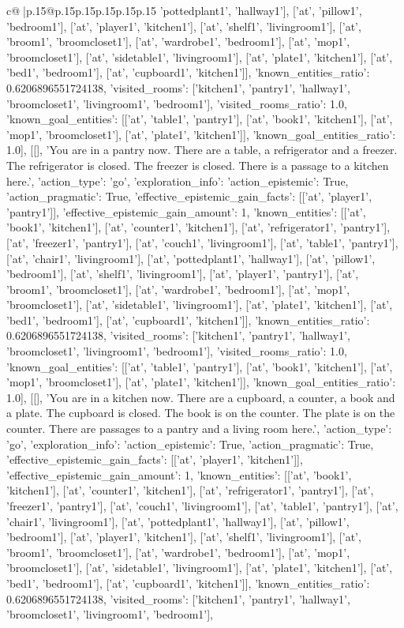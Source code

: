 \documentclass{article}
\begin{document}
{\begin{supertabular}{c@{$\;$}|p{.15\linewidth}@{}p{.15\linewidth}p{.15\linewidth}p{.15\linewidth}p{.15\linewidth}p{.15\linewidth}}
{{{'pottedplant1', 'hallway1'], ['at', 'pillow1', 'bedroom1'], ['at', 'player1', 'kitchen1'], ['at', 'shelf1', 'livingroom1'], ['at', 'broom1', 'broomcloset1'], ['at', 'wardrobe1', 'bedroom1'], ['at', 'mop1', 'broomcloset1'], ['at', 'sidetable1', 'livingroom1'], ['at', 'plate1', 'kitchen1'], ['at', 'bed1', 'bedroom1'], ['at', 'cupboard1', 'kitchen1']], 'known_entities_ratio': 0.6206896551724138, 'visited_rooms': ['kitchen1', 'pantry1', 'hallway1', 'broomcloset1', 'livingroom1', 'bedroom1'], 'visited_rooms_ratio': 1.0, 'known_goal_entities': [['at', 'table1', 'pantry1'], ['at', 'book1', 'kitchen1'], ['at', 'mop1', 'broomcloset1'], ['at', 'plate1', 'kitchen1']], 'known_goal_entities_ratio': 1.0}}], [[], 'You are in a pantry now. There are a table, a refrigerator and a freezer. The refrigerator is closed. The freezer is closed. There is a passage to a kitchen here.', {'action_type': 'go', 'exploration_info': {'action_epistemic': True, 'action_pragmatic': True, 'effective_epistemic_gain_facts': [['at', 'player1', 'pantry1']], 'effective_epistemic_gain_amount': 1, 'known_entities': [['at', 'book1', 'kitchen1'], ['at', 'counter1', 'kitchen1'], ['at', 'refrigerator1', 'pantry1'], ['at', 'freezer1', 'pantry1'], ['at', 'couch1', 'livingroom1'], ['at', 'table1', 'pantry1'], ['at', 'chair1', 'livingroom1'], ['at', 'pottedplant1', 'hallway1'], ['at', 'pillow1', 'bedroom1'], ['at', 'shelf1', 'livingroom1'], ['at', 'player1', 'pantry1'], ['at', 'broom1', 'broomcloset1'], ['at', 'wardrobe1', 'bedroom1'], ['at', 'mop1', 'broomcloset1'], ['at', 'sidetable1', 'livingroom1'], ['at', 'plate1', 'kitchen1'], ['at', 'bed1', 'bedroom1'], ['at', 'cupboard1', 'kitchen1']], 'known_entities_ratio': 0.6206896551724138, 'visited_rooms': ['kitchen1', 'pantry1', 'hallway1', 'broomcloset1', 'livingroom1', 'bedroom1'], 'visited_rooms_ratio': 1.0, 'known_goal_entities': [['at', 'table1', 'pantry1'], ['at', 'book1', 'kitchen1'], ['at', 'mop1', 'broomcloset1'], ['at', 'plate1', 'kitchen1']], 'known_goal_entities_ratio': 1.0}}], [[], 'You are in a kitchen now. There are a cupboard, a counter, a book and a plate. The cupboard is closed. The book is on the counter. The plate is on the counter. There are passages to a pantry and a living room here.', {'action_type': 'go', 'exploration_info': {'action_epistemic': True, 'action_pragmatic': True, 'effective_epistemic_gain_facts': [['at', 'player1', 'kitchen1']], 'effective_epistemic_gain_amount': 1, 'known_entities': [['at', 'book1', 'kitchen1'], ['at', 'counter1', 'kitchen1'], ['at', 'refrigerator1', 'pantry1'], ['at', 'freezer1', 'pantry1'], ['at', 'couch1', 'livingroom1'], ['at', 'table1', 'pantry1'], ['at', 'chair1', 'livingroom1'], ['at', 'pottedplant1', 'hallway1'], ['at', 'pillow1', 'bedroom1'], ['at', 'player1', 'kitchen1'], ['at', 'shelf1', 'livingroom1'], ['at', 'broom1', 'broomcloset1'], ['at', 'wardrobe1', 'bedroom1'], ['at', 'mop1', 'broomcloset1'], ['at', 'sidetable1', 'livingroom1'], ['at', 'plate1', 'kitchen1'], ['at', 'bed1', 'bedroom1'], ['at', 'cupboard1', 'kitchen1']], 'known_entities_ratio': 0.6206896551724138, 'visited_rooms': ['kitchen1', 'pantry1', 'hallway1', 'broomcloset1', 'livingroom1', 'bedroom1'], }}}
\end{supertabular}}
\end{document}
